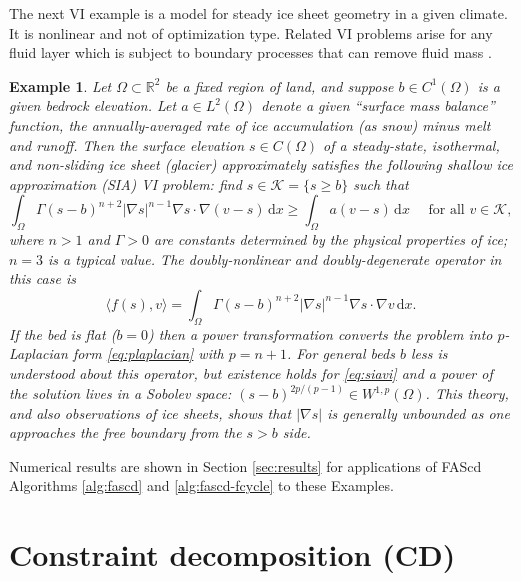 \documentclass[letterpaper,final,12pt,reqno]{amsart}
\theoremstyle{cstyle}
\theoremstyle{cstyle*}
\theoremstyle{dstyle}
\newtheorem{example}[theorem]{Example}
\numberwithin{equation}{section}
\numberwithin{figure}{section}
\numberwithin{table}{section}
\numberwithin{theorem}{section}
\newcommand{\RR}{\mathbb{R}}
\newcommand{\grad}{\nabla}
\newcommand{\ip}[2]{\langle#1,#2\rangle}
\newcommand{\dx}{\, \mathrm{d}x}
\begin{document}
The next VI example is a model for steady ice sheet geometry in a given climate. It is nonlinear and not of optimization type. Related VI problems arise for any fluid layer which is subject to boundary processes that can remove fluid mass \cite{Bueler2021conservation}.

\begin{example}  \label{ex:sia}  Let $\Omega \subset \RR^2$ be a fixed region of land, and suppose $b \in C^1(\Omega)$ is a given bedrock elevation.  Let $a \in L^2(\Omega)$ denote a given ``surface mass balance'' function, the annually-averaged rate of ice accumulation (as snow) minus melt and runoff.  Then the surface elevation $s\in C(\Omega)$ of a steady-state, isothermal, and non-sliding ice sheet (glacier) approximately satisfies the following \emph{shallow ice approximation} (SIA) \cite{GreveBlatter2009} VI problem: find $s \in \mathcal{K} = \{s\ge b\}$ such that
\begin{equation}
\int_\Omega \Gamma (s-b)^{n+2} |\grad s|^{n-1} \grad s \cdot \grad (v-s) \dx \ge \int_\Omega a (v-s)\dx \quad \text{ for all } v \in \mathcal{K}, \label{eq:siavi}
\end{equation}
where $n>1$ and $\Gamma>0$ are constants determined by the physical properties of ice; $n=3$ is a typical value.  The doubly-nonlinear and doubly-degenerate operator in this case is
\begin{equation}
\ip{f(s)}{v} = \int_\Omega \Gamma (s-b)^{n+2} |\grad s|^{n-1} \grad s \cdot \grad v\dx. \label{eq:sia}
\end{equation}
If the bed is flat ($b=0$) then a power transformation converts the problem into $p$-Laplacian form \eqref{eq:plaplacian} with $p=n+1$.  For general beds $b$ less is understood about this operator, but existence holds for \eqref{eq:siavi} \cite{JouvetBueler2012} and a power of the solution lives in a Sobolev space: $(s-b)^{2p/(p-1)} \in W^{1,p}(\Omega)$.  This theory, and also observations of ice sheets, shows that $|\grad s|$ is generally unbounded as one approaches the free boundary from the $s>b$ side.
\end{example}

Numerical results are shown in Section \ref{sec:results} for applications of FAScd Algorithms \ref{alg:fascd} and \ref{alg:fascd-fcycle} to these Examples.


\section{Constraint decomposition (CD)} \label{sec:cd}
\end{document}

